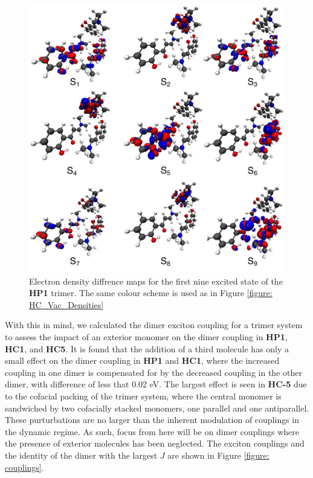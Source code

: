 \begin{figure}[H]
\centering
  \includegraphics[width=\linewidth]{trimer_excitations}
  \caption[Electron density diffrence maps for the first nine excited state of the \textbf{HP1} trimer.]{Electron density diffrence maps for the first nine excited state of the \textbf{HP1} trimer. The same colour scheme is used as in Figure \ref{figure: HC_Vac_Densities}}
  \label{figure: trimer_excitations}
\end{figure} 


With this in mind, we  calculated the dimer exciton coupling for a trimer system to assess the impact of an exterior monomer on the dimer coupling in \textbf{HP1}, \textbf{HC1}, and \textbf{HC5}. It is found that the addition of a third molecule has only a small effect on the dimer coupling in \textbf{HP1} and \textbf{HC1}, where the increased coupling in one dimer is compensated for by the decreased coupling in the other dimer, with difference of less that 0.02 eV. The largest effect is seen in \textbf{HC-5} due to the cofacial packing of the trimer system, where the central monomer is sandwiched by two cofacially stacked monomers, one parallel and one antiparallel.  These purturbations are no larger than the inherent modulation of couplings in the dynamic regime.\cite{Arago2015,Arago2016} As such, focus from here will be on dimer couplings where the presence of exterior molecules has been neglected. The exciton couplings and the identity of the dimer with the largest $J$ are shown in Figure \ref{figure: couplings}.

